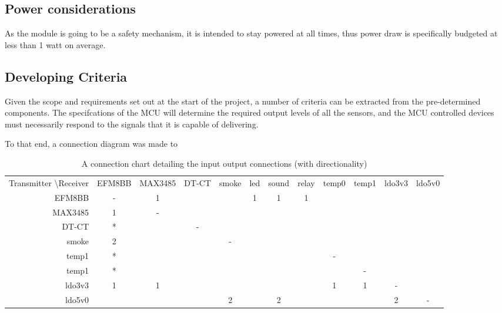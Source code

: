 \documentclass[12pt]{article}
\begin{document}
    \subsection{Power considerations}
    As the module is going to be a safety mechanism, it is intended to stay powered at all times, thus power draw is specifically budgeted at less than 1 watt on average.
    

	
  \subsection{Developing Criteria}
  Given the scope and requirements set out at the start of the project, a number of criteria can be extracted from the pre-determined components. The specifcations of the MCU will determine the required output levels of all the sensors, and the MCU controlled devices must necessarily respond to the signals that it is capable of delivering.

  To that end, a connection diagram was made to 

  \begin{table}[]
    \caption{A connection chart detailing the input output connections (with directionality)}
    \label{tab:connect_diag}
    \begin{tabular}{rccccccccccc}
      Transmitter \textbackslash Receiver & EFM8BB & MAX3485 & DT-CT & smoke & led & sound & relay & temp0 & temp1 & ldo3v3 & ldo5v0 \\
      EFM8BB                              & -      & 1       &       &       & 1   & 1     & 1     &       &       &        &        \\
      MAX3485                             & 1      & -       &       &       &     &       &       &       &       &        &        \\
      DT-CT                               & *      &         & -     &       &     &       &       &       &       &        &        \\
      smoke                               & 2      &         &       & -     &     &       &       &       &       &        &        \\
      temp1                               & *      &         &       &       &     &       &       & -     &       &        &        \\
      temp1                               & *      &         &       &       &     &       &       &       & -     &        &        \\
      ldo3v3                              & 1      & 1       &       &       &     &       &       & 1     & 1     & -      &        \\
      ldo5v0                              &        &         &       & 2     &     & 2     &       &       &       & 2      & -     
    \end{tabular}
  \end{table}
\end{document}

